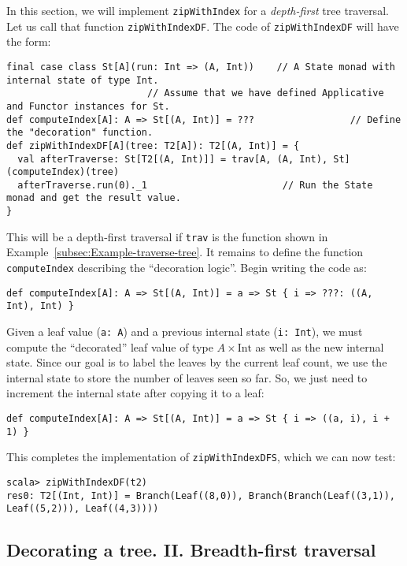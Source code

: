 In this section, we will implement \lstinline!zipWithIndex! for a
\emph{depth-first} tree traversal. Let us call that function \lstinline!zipWithIndexDF!.
The code of \lstinline!zipWithIndexDF! will have the form:
\begin{lstlisting}
final case class St[A](run: Int => (A, Int))    // A State monad with internal state of type Int.
                         // Assume that we have defined Applicative and Functor instances for St.
def computeIndex[A]: A => St[(A, Int)] = ???                 // Define the "decoration" function.
def zipWithIndexDF[A](tree: T2[A]): T2[(A, Int)] = {
  val afterTraverse: St[T2[(A, Int)]] = trav[A, (A, Int), St](computeIndex)(tree)
  afterTraverse.run(0)._1                        // Run the State monad and get the result value.
}
\end{lstlisting}
This will be a depth-first traversal if \lstinline!trav! is the function
shown in Example~\ref{subsec:Example-traverse-tree}. It remains
to define the function \lstinline!computeIndex! describing the \textsf{``}decoration
logic\textsf{''}. Begin writing the code as:
\begin{lstlisting}
def computeIndex[A]: A => St[(A, Int)] = a => St { i => ???: ((A, Int), Int) }
\end{lstlisting}
Given a leaf value (\lstinline!a: A!) and a previous internal state
(\lstinline!i: Int!), we must compute the \textsf{``}decorated\textsf{''} leaf value
of type $A\times\text{Int}$ as well as the new internal state. Since
our goal is to label the leaves by the current leaf count, we use
the internal state to store the number of leaves seen so far. So,
we just need to increment the internal state after copying it to a
leaf:
\begin{lstlisting}
def computeIndex[A]: A => St[(A, Int)] = a => St { i => ((a, i), i + 1) }
\end{lstlisting}
This completes the implementation of \lstinline!zipWithIndexDFS!,
which we can now test:
\begin{lstlisting}
scala> zipWithIndexDF(t2)
res0: T2[(Int, Int)] = Branch(Leaf((8,0)), Branch(Branch(Leaf((3,1)), Leaf((5,2))), Leaf((4,3))))
\end{lstlisting}


\subsection{Decorating a tree. II. Breadth-first traversal\label{subsec:Decorating-a-tree-breadth-first-traversal}}

